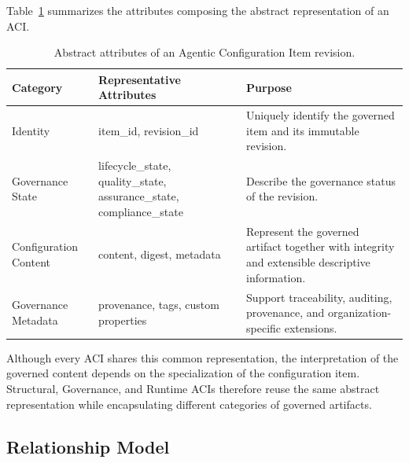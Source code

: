 \documentclass[10pt]{article}
\begin{document}
Table~\ref{tab:aci_attributes} summarizes the attributes composing the abstract representation of an ACI.

\begin{table}[t]
\centering
\caption{Abstract attributes of an Agentic Configuration Item revision.}
\label{tab:aci_attributes}

\renewcommand{\arraystretch}{1.15}

\begin{tabular}{p{3.3cm}p{3.4cm}p{8.3cm}}

\toprule

\textbf{Category} &
\textbf{Representative Attributes} &
\textbf{Purpose}

\\
\midrule

Identity &
item\_id, revision\_id &
Uniquely identify the governed item and its immutable revision.

\\

Governance State &
lifecycle\_state, quality\_state, assurance\_state, compliance\_state &
Describe the governance status of the revision.

\\

Configuration Content &
content, digest, metadata &
Represent the governed artifact together with integrity and extensible descriptive information.

\\

Governance Metadata &
provenance, tags, custom properties &
Support traceability, auditing, provenance, and organization-specific extensions.

\\

\bottomrule

\end{tabular}

\end{table}

Although every ACI shares this common representation, the interpretation of the governed content depends on the specialization of the configuration item. Structural, Governance, and Runtime ACIs therefore reuse the same abstract representation while encapsulating different categories of governed artifacts.

\subsection{Relationship Model}
\label{sec:configuration_relationships}
\end{document}
